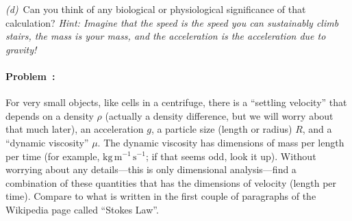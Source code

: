 \documentclass[12pt]{article}
\newcommand{\kg}{\mathrm{kg}}
\newcommand{\m}{\mathrm{m}}
\newcommand{\s}{\mathrm{s}}
\begin{document}
\textsl{(d)}~Can you think of any biological or physiological
significance of that calculation?  \emph{Hint: Imagine that the speed
  is the speed you can sustainably climb stairs, the mass is your
  mass, and the acceleration is the acceleration due to gravity!}

\paragraph{Problem~\theproblem:}%
For very small objects, like cells in a centrifuge, there is a
``settling velocity'' that depends on a density $\rho$ (actually a
density difference, but we will worry about that much later), an
acceleration $g$, a particle size (length or radius) $R$, and a
``dynamic viscosity'' $\mu$.  The dynamic viscosity has dimensions
of mass per length per time (for example, $\kg\,\m^{-1}\,\s^{-1}$; if that seems odd, look it up).  Without
worrying about any details---this is only dimensional analysis---find
a combination of these quantities that has the dimensions of velocity
(length per time).  Compare to what is written in the first couple of
paragraphs of the Wikipedia page called ``Stokes Law''.
\end{document}
